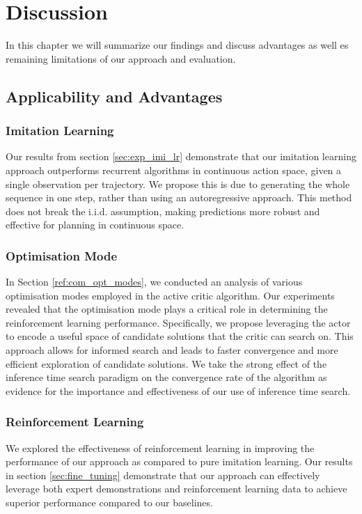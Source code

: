 
\chapter{Discussion}
\label{chapter:Discussion}
In this chapter we will summarize our findings and discuss advantages as well es remaining limitations of our approach and evaluation.
\section{Applicability and Advantages}
\subsection{Imitation Learning}
Our results from section \ref{sec:exp_imi_lr} demonstrate that our imitation learning approach outperforms recurrent algorithms in continuous action space, 
given a single observation per trajectory. We propose this is due to generating the whole sequence in one step, 
rather than using an autoregressive approach. This method does not break the i.i.d. assumption, making predictions more robust and effective 
for planning in continuous space. \\

\subsection{Optimisation Mode}
In Section \ref{ref:com_opt_modes}, we conducted an analysis of various optimisation modes employed in the active critic algorithm. 
Our experiments revealed that the optimisation mode plays a critical role in determining the reinforcement learning performance. 
Specifically, we propose leveraging the actor to encode a useful space of candidate solutions that the critic can search on. 
This approach allows for informed search and leads to faster convergence and more efficient exploration of candidate solutions. We take the strong effect of the inference time 
search paradigm on the convergence rate of the algorithm as evidence for the importance and effectiveness of our use of inference time search.

\subsection{Reinforcement Learning}
We explored the effectiveness of reinforcement learning in improving the performance of our approach as compared to pure imitation learning. 
Our results in section \ref{sec:fine_tuning} demonstrate that our approach can effectively leverage both expert demonstrations and reinforcement learning data to achieve 
superior performance compared to our baselines.\\

